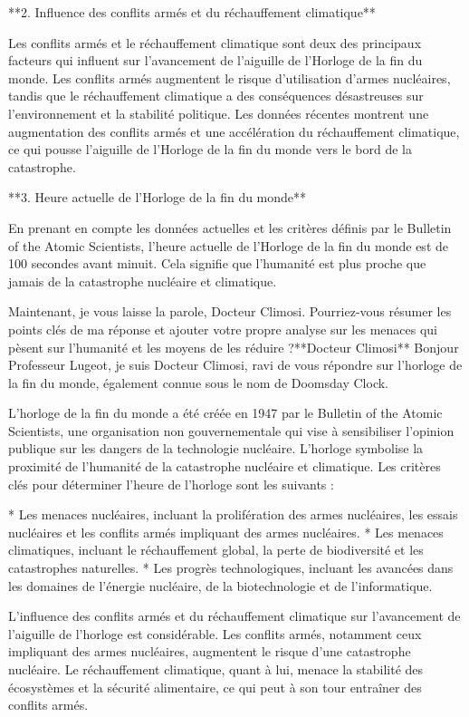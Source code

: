 **2. Influence des conflits armés et du réchauffement climatique**

Les conflits armés et le réchauffement climatique sont deux des principaux facteurs qui influent sur l'avancement de l'aiguille de l'Horloge de la fin du monde. Les conflits armés augmentent le risque d'utilisation d'armes nucléaires, tandis que le réchauffement climatique a des conséquences désastreuses sur l'environnement et la stabilité politique. Les données récentes montrent une augmentation des conflits armés et une accélération du réchauffement climatique, ce qui pousse l'aiguille de l'Horloge de la fin du monde vers le bord de la catastrophe.

**3. Heure actuelle de l'Horloge de la fin du monde**

En prenant en compte les données actuelles et les critères définis par le Bulletin of the Atomic Scientists, l'heure actuelle de l'Horloge de la fin du monde est de 100 secondes avant minuit. Cela signifie que l'humanité est plus proche que jamais de la catastrophe nucléaire et climatique.

Maintenant, je vous laisse la parole, Docteur Climosi. Pourriez-vous résumer les points clés de ma réponse et ajouter votre propre analyse sur les menaces qui pèsent sur l'humanité et les moyens de les réduire ?**Docteur Climosi**
Bonjour Professeur Lugeot, je suis Docteur Climosi, ravi de vous répondre sur l'horloge de la fin du monde, également connue sous le nom de Doomsday Clock.

L'horloge de la fin du monde a été créée en 1947 par le Bulletin of the Atomic Scientists, une organisation non gouvernementale qui vise à sensibiliser l'opinion publique sur les dangers de la technologie nucléaire. L'horloge symbolise la proximité de l'humanité de la catastrophe nucléaire et climatique. Les critères clés pour déterminer l'heure de l'horloge sont les suivants :

* Les menaces nucléaires, incluant la prolifération des armes nucléaires, les essais nucléaires et les conflits armés impliquant des armes nucléaires.
* Les menaces climatiques, incluant le réchauffement global, la perte de biodiversité et les catastrophes naturelles.
* Les progrès technologiques, incluant les avancées dans les domaines de l'énergie nucléaire, de la biotechnologie et de l'informatique.

L'influence des conflits armés et du réchauffement climatique sur l'avancement de l'aiguille de l'horloge est considérable. Les conflits armés, notamment ceux impliquant des armes nucléaires, augmentent le risque d'une catastrophe nucléaire. Le réchauffement climatique, quant à lui, menace la stabilité des écosystèmes et la sécurité alimentaire, ce qui peut à son tour entraîner des conflits armés.


